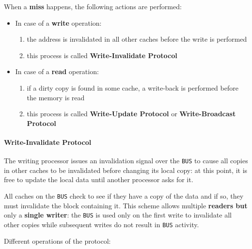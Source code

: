 \documentclass[english]{article}
\begin{document}
\bigskip
When a \textbf{miss} happens, the following actions are performed:

\begin{itemize}
  \item In case of a \textbf{write} operation:
        \begin{enumerate}
          \item the address is invalidated in all other caches before the write is performed
          \item this process is called \textbf{Write-Invalidate Protocol}
        \end{enumerate}
  \item In case of a \textbf{read} operation:
        \begin{enumerate}
          \item if a dirty copy is found in some cache, a write-back is performed before the memory is read
          \item this process is called \textbf{Write-Update Protocol} or \textbf{Write-Broadcast Protocol}
        \end{enumerate}
\end{itemize}

\paragraph{Write-Invalidate Protocol}

The writing processor issues an invalidation signal over the \texttt{BUS} to cause all copies in other caches to be invalidated before changing its local copy:
at this point, it is free to update the local data until another processor asks for it.

All caches on the \texttt{BUS} check to see if they have a copy of the data and if so, they must invalidate the block containing it.
This scheme allows multiple \textbf{readers but} only a \textbf{single writer}: the \texttt{BUS} is used only on the first write to invalidate all other copies while subsequent writes do not result in \texttt{BUS} activity.

\bigskip
Different operations of the protocol:
\end{document}
